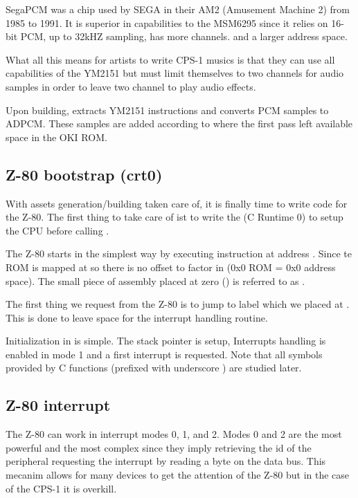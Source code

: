 SegaPCM was a chip used by SEGA in their AM2 (Amusement Machine 2) from 1985 to 1991. It is superior in capabilities to the MSM6295 since it relies on 16-bit PCM, up to 32kHZ sampling, has more channels. and a larger address space.

What all this means for artists to write CPS-1 musics is that they can use all capabilities of the YM2151 but must limit themselves to two channels for audio samples in order to leave two channel to play audio effects. 

Upon building,  extracts YM2151 instructions and converts PCM samples to ADPCM. These samples are added according to where the first pass left available space in the OKI ROM.


\subsection{Z-80 bootstrap (crt0)}

With assets generation/building taken care of, it is finally time to write code for the Z-80. The first thing to take care of ist to write the  (C Runtime 0) to setup the CPU before calling .

The Z-80 starts in the simplest way by executing instruction at address . Since te ROM is mapped at  so there is no offset to factor in (0x0 ROM = 0x0 address space). The small piece of assembly placed at zero () is referred to as .
\pagebreak



The first thing we request from the Z-80 is to jump to label  which we placed at . This is done to leave space for the interrupt handling routine.

Initialization in  is simple. The stack pointer  is setup, Interrupts handling is enabled in mode 1 and a first interrupt is requested. Note that all symbols provided by C functions (prefixed with underscore \icode{\_}) are studied later.

\subsection{Z-80 interrupt}
The Z-80 can work in interrupt modes 0, 1, and 2. Modes 0 and 2 are the most powerful and the most complex since they imply retrieving the id of the peripheral requesting the interrupt by reading a byte on the data bus. This mecanim allows for many devices to get the attention of the Z-80 but in the case of the CPS-1 it is overkill. 

